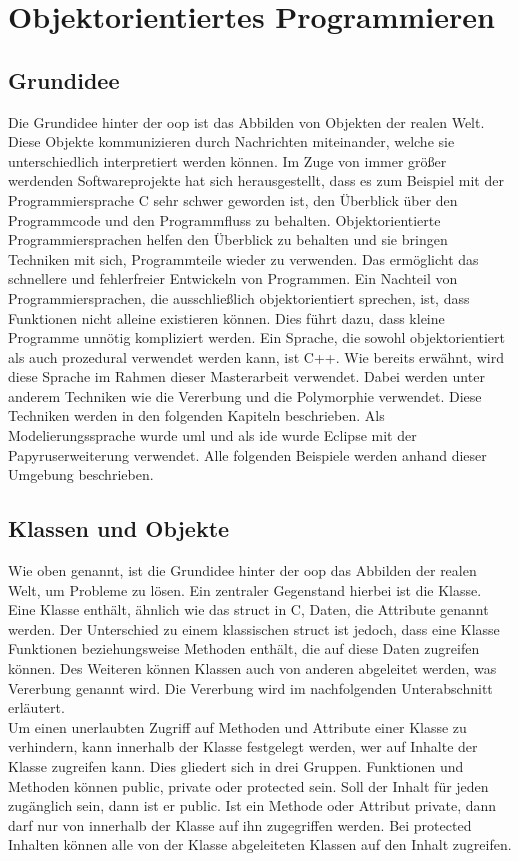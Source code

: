 \section{Objektorientiertes Programmieren }

\subsection{Grundidee }
Die Grundidee hinter der \acf{oop} ist das Abbilden von Objekten der realen Welt. Diese Objekte kommunizieren durch Nachrichten miteinander, welche sie  unterschiedlich interpretiert werden können.  Im Zuge von immer größer werdenden Softwareprojekte hat sich herausgestellt, dass es zum Beispiel mit der Programmiersprache C sehr schwer geworden ist, den  Überblick über den Programmcode und den Programmfluss zu behalten. Objektorientierte Programmiersprachen helfen den Überblick zu behalten und sie bringen Techniken mit sich, Programmteile wieder zu verwenden. Das ermöglicht  das schnellere und fehlerfreier Entwickeln von Programmen. Ein Nachteil von Programmiersprachen, die ausschließlich objektorientiert sprechen, ist, dass Funktionen nicht alleine existieren können. Dies führt dazu, dass kleine Programme unnötig kompliziert werden. Ein Sprache, die sowohl objektorientiert als auch prozedural verwendet werden kann, ist C++. Wie bereits erwähnt, wird diese Sprache im Rahmen dieser Masterarbeit verwendet.    
Dabei werden unter anderem  Techniken wie die Vererbung und die Polymorphie verwendet. Diese Techniken werden in den folgenden Kapiteln beschrieben. Als Modelierungssprache wurde \ac{uml} und als \ac{ide} wurde Eclipse mit der Papyruserweiterung verwendet. Alle folgenden Beispiele werden anhand dieser Umgebung beschrieben.  
\cite{HelmutErlenkotter.}
\cite{Prof.Dr.AlfredIrber.}

\subsection{Klassen und Objekte}
Wie oben genannt, ist die Grundidee hinter der \ac{oop} das Abbilden der realen Welt, um Probleme zu lösen. Ein zentraler Gegenstand hierbei ist die Klasse. Eine Klasse enthält, ähnlich wie das \glqq struct\grqq{} in C, Daten, die Attribute genannt werden. Der Unterschied zu einem klassischen  \glqq struct\grqq{} ist jedoch, dass eine Klasse Funktionen beziehungsweise Methoden enthält, die auf diese Daten zugreifen können. Des Weiteren können  Klassen auch von anderen abgeleitet werden, was Vererbung genannt wird. Die Vererbung wird im nachfolgenden Unterabschnitt erläutert. \\
Um einen unerlaubten Zugriff auf Methoden und Attribute einer Klasse zu verhindern, kann innerhalb der Klasse festgelegt werden, wer auf Inhalte der Klasse zugreifen kann. Dies gliedert sich in drei Gruppen. Funktionen und Methoden können \glqq public\grqq{},  \glqq private\grqq{} oder \glqq protected\grqq{} sein. Soll der Inhalt für jeden zugänglich sein, dann ist er \glqq public\grqq{}. Ist ein Methode oder Attribut \glqq private\grqq{}, dann darf nur von innerhalb der Klasse auf ihn zugegriffen werden. Bei \glqq protected\grqq{} Inhalten können alle von der Klasse abgeleiteten Klassen auf den Inhalt zugreifen.

